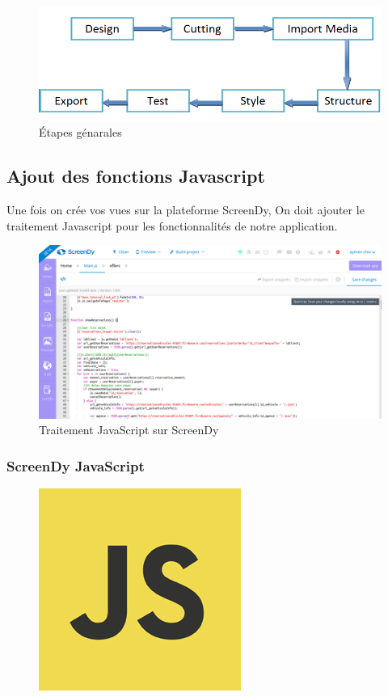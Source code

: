 \documentclass[12pt,a4paper]{report}
\begin{document}
		
			\begin{figure}[!hbtp]
				\centering
				\includegraphics[scale=0.5]{./graphics/general-steps.png}
				\caption{\'Etapes génarales}
			\end{figure}	

			\newpage


		\subsection{Ajout des fonctions Javascript}
Une fois on crée vos vues sur la plateforme ScreenDy, On doit ajouter le traitement Javascript pour les fonctionnalités de notre application.
			\begin{figure}[!hbtp]
			\centering
			\includegraphics[scale=0.3]{./graphics/js_screendy.png}
			\caption{Traitement JavaScript sur ScreenDy}
			\end{figure}

			\subsubsection{ScreenDy JavaScript}
			\begin{figure}
			\includegraphics[scale=0.5]{./graphics/js.png}
			\end{figure}
\end{document}
